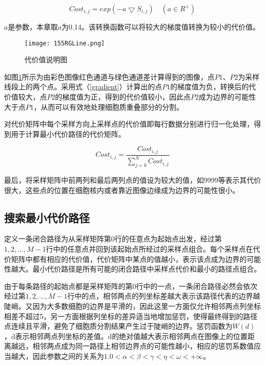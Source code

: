 \documentclass[nomlist,masters]{seuthesix}
\begin{document}
\begin{equation}
Cost_{i,j}=exp\left ( -a\bigtriangledown S_{i,j} \right ) \quad  \left ( a\in R^{+} \right )
\label{cost}
\end{equation}

$a$是参数，本章取$a$为0.14。该转换函数可以将较大的梯度值转换为较小的代价值。

\begin{figure}[H]
\centering
\texttt{[image: 155RGLine.png]}
\caption{代价值说明图\label{RGcost}}
\end{figure}

如图\ref{RGcost}所示为由彩色图像红色通道与绿色通道差计算得到的图像，点$P1$、$P2$为采样线段上的两个点。采用式（\ref{gradient}）计算出的点$P1$的梯度值为负，转换后的代价值较大，点$P2$的梯度值为正，得到的代价值较小，因此点$P2$成为边界的可能性大于点$P1$，从而可以有效地处理细胞质重叠部分的分割。

对代价矩阵中每个采样方向上采样点的代价值即每行数据分别进行归一化处理，得到用于计算最小代价路径的代价矩阵。

\begin{equation}
Cost_{i,j}=\frac{Cost_{i,j}}{\sum\limits_{j=0}^{N}Cost_{i,j}}
\label{norcost}
\end{equation}

最后，将采样矩阵中前两列和最后两列点的值设为较大的值，如9999等表示其代价很大，这些点的位置在细胞核内或者靠近图像边缘成为边界的可能性很小。

\subsection{搜索最小代价路径}

定义一条闭合路径为从采样矩阵第0行的任意点为起始点出发，经过第$1,2,...,M-1$行中的任意点并回到该起始点所经过的采样点组合。每个采样点在代价矩阵中都有相应的代价值，代价矩阵中某点的值越小，表示该点成为边界的可能性越大。最小代价路径是所有可能的闭合路径中采样点代价和最小的路径点组合。

由于每条路径的起始点都是采样矩阵的第0行中的一点，一条闭合路径必然会依次经过第$1,2,...,M-1$行中的点，相邻两点的列坐标差越大表示该路径代表的边界越陡峭。又因为大多数细胞的边界是平滑的，因此这里一方面仅允许相邻两点列坐标相差不超过5，另一方面根据列坐标的差异适当地增加惩罚，使得最终得到的路径点连续且平滑，避免了细胞质分割结果产生过于陡峭的边界。惩罚函数为$W(d)$，d表示相邻两点列坐标的差值。d的绝对值越大表示相邻两点在图像上的位置距离越远，相邻两点成为同一路径上相邻边界点的可能性越小，相应的惩罚系数值应当越大，因此参数之间的关系为$ 1.0<\alpha<\beta<\gamma<\eta<\omega<  +\infty$。
\end{document}
